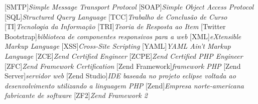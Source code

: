 			[SMTP]{\textit{Simple Message Transport Protocol}}
			[SOAP]{\textit{Simple Object Access Protocol}}
			[SQL]{\textit{Structured Query Language}}
			[TCC]{\textit{Trabalho de Conclusão de Curso}}
			[TI]{\textit{Tecnologia da Informação}}
			[TRI]{\textit{Teoria de Resposta ao Item}}
[Twitter Bootstrap]{\textit{biblioteca de
componentes responsivos para a web}}
			[XML]{\textit{eXtensible Markup Language}}
			[XSS]{\textit{Cross-Site Scripting}}
			[YAML]{\textit{YAML Ain't Markup Language}}
			[ZCE]{\textit{Zend Certified Engineer}}
			[ZCPE]{\textit{Zend Certified PHP Engineer}}
			[ZFC]{\textit{Zend Framework Certification}}
[Zend Framework]{\textit{framework PHP}}
	[Zend Server]{\textit{servidor web}}
	[Zend Studio]{\textit{IDE baseada no projeto eclipse voltada
ao desenvolvimento utilizando a linguagem PHP}}
			[Zend]{\textit{Empresa norte-americana fabricante de software}}
			[ZF2]{\textit{Zend Framework 2}}